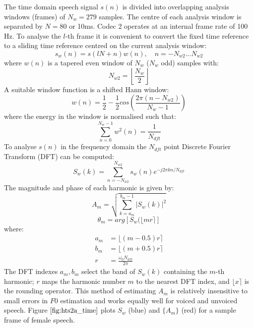\documentclass{article}
\begin{document}
{The time domain speech signal $s(n)$ is divided into overlapping analysis windows (frames) of $N_w=279$ samples. The centre of each analysis window is separated by $N=80$ or 10ms. Codec 2 operates at an internal frame rate of 100 Hz. To analyse the $l$-th frame it is convenient to convert the fixed time reference to a sliding time reference centred on the current analysis window:
\begin{equation}
s_w(n) = s(lN + n) w(n), \quad n = - N_{w2} ... N_{w2}
\end{equation}
where $w(n)$ is a tapered even window of $N_w$ ($N_w$ odd) samples with:
\begin{equation}
N_{w2} = \left \lfloor \frac{N_w}{2} \right \rfloor
\end{equation}
A suitable window function is a shifted Hann window:
\begin{equation}
w(n) = \frac{1}{2} - \frac{1}{2} cos \left(\frac{2 \pi (n- N_{w2})}{N_w-1} \right)
\end{equation}
where the energy in the window is normalised such that:
\begin{equation}
\sum_{n=0}^{N_w-1}w^2(n) = \frac{1}{N_{dft}}
\end{equation}
To analyse $s(n)$ in the frequency domain the $N_{dft}$ point Discrete Fourier Transform (DFT) can be computed:
\begin{equation}
S_w(k) = \sum_{n=-N_{w2}}^{N_{w2}} s_w(n) e^{-j 2 \pi k n / N_{dft}}
\end{equation}
The magnitude and phase of each harmonic is given by:
\begin{equation}
\label{eq:mag_est}
A_m = \sqrt{\sum_{k=a_m}^{b_m-1} |S_w(k)|^2 }
\end{equation}
\begin{equation}
\theta_m = arg \left[ S_w(\lfloor m r \rceil \right]
\end{equation}
where:
\begin{equation}
\begin{split}
a_m      &= \lfloor (m - 0.5)r \rceil \\
b_m      &= \lfloor (m + 0.5)r \rceil \\
r        &= \frac{\omega_0 N_{dft}}{2 \pi} 
\end{split}
\end{equation}
The DFT indexes $a_m, b_m$ select the band of $S_w(k)$ containing the $m$-th harmonic; $r$ maps the harmonic number $m$ to the nearest DFT index, and $\lfloor x \rceil$ is the rounding operator. This method of estimating $A_m$ is relatively insensitive to small errors in $F0$ estimation and works equally well for voiced and unvoiced speech.  Figure $\ref{fig:hts2a_time}$ plots $S_w$ (blue) and $\{A_m\}$ (red) for a sample frame of female speech.

}
\end{document}
